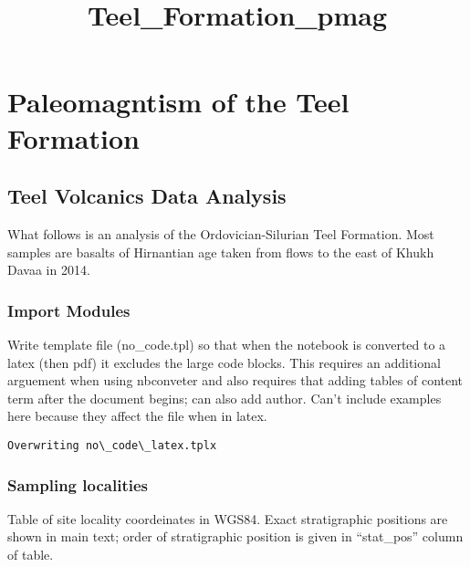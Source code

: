 \documentclass[11pt]{article}
\title{Teel\_Formation\_pmag}
\begin{document}
    
    
    \maketitle
    \tableofcontents
    

    
    \section{Paleomagntism of the Teel
Formation}\label{paleomagntism-of-the-teel-formation}

    \subsection{Teel Volcanics Data
Analysis}\label{teel-volcanics-data-analysis}

    What follows is an analysis of the Ordovician-Silurian Teel Formation.
Most samples are basalts of Hirnantian age taken from flows to the east
of Khukh Davaa in 2014.

    \subsubsection{Import Modules}\label{import-modules}


    Write template file (no\_code.tpl) so that when the notebook is
converted to a latex (then pdf) it excludes the large code blocks. This
requires an additional arguement when using nbconveter and also requires
that adding tables of content term after the document begins; can also
add author. Can't include examples here because they affect the file
when in latex.


    \begin{Verbatim}[commandchars=\\\{\}]
Overwriting no\_code\_latex.tplx
    \end{Verbatim}

    \subsubsection{Sampling localities}\label{sampling-localities}

    Table of site locality coordeinates in WGS84. Exact stratigraphic
positions are shown in main text; order of stratigraphic position is
given in ``stat\_pos'' column of table.
\end{document}
